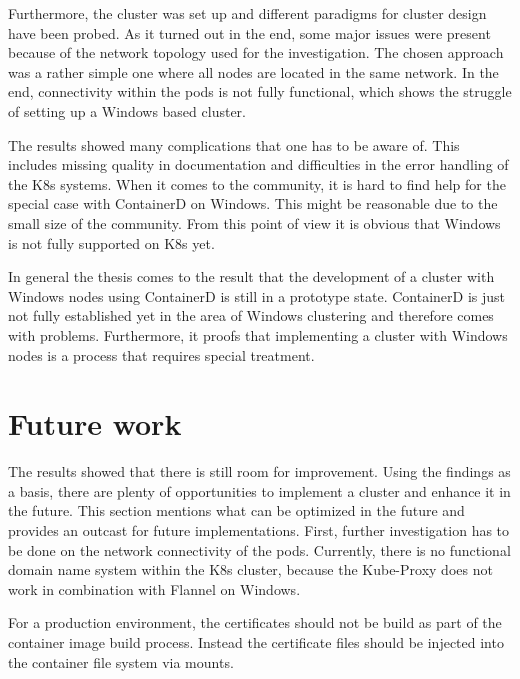 Furthermore, the cluster was set up and different paradigms for cluster design have been probed. As it turned out in the end, some major issues were present because of the network topology used for the investigation. The chosen approach was a rather simple one where all nodes are located in the same network. In the end, connectivity within the pods is not fully functional, which shows the struggle of setting up a \ac{Windows} based cluster.

The results showed many complications that one has to be aware of. This includes missing quality in documentation and difficulties in the error handling of the \ac{K8s} systems. When it comes to the community, it is hard to find help for the special case with ContainerD on \ac{Windows}. This might be reasonable due to the small size of the community. From this point of view it is obvious that \ac{Windows} is not fully supported on \ac{K8s} yet.





In general the thesis comes to the result that the development of a cluster with \ac{Windows} nodes using ContainerD is still in a prototype state. ContainerD is just not fully established yet in the area of \ac{Windows} clustering and therefore comes with problems. Furthermore, it proofs that implementing a cluster with \ac{Windows} nodes is a process that requires special treatment. 


\section{Future work}
The results showed that there is still room for improvement. Using the findings as a basis, there are plenty of opportunities to implement a cluster and enhance it in the future. This section mentions what can be optimized in the future and provides an outcast for future implementations.
First, further investigation has to be done on the network connectivity of the pods. Currently, there is no functional domain name system within the \ac{K8s} cluster, because the Kube-Proxy does not work in combination with Flannel on \ac{Windows}.

For a production environment, the certificates should not be build as part of the container image build process. Instead the certificate files should be injected into the container file system via mounts.

